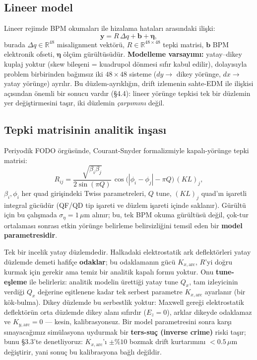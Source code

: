 \documentclass[twocolumn,a4paper,10pt]{article}
\begin{document}
\subsection{Lineer model}
Lineer rejimde BPM okumaları ile hizalama hataları arasındaki ilişki:
\begin{equation}
\mathbf{y} = R\,\Delta q + \mathbf{b} + \boldsymbol{\eta},
\label{eq:lin}
\end{equation}
burada $\Delta q\in\mathbb{R}^{48}$ misalignment vektörü,
$R\in\mathbb{R}^{48\times48}$ tepki matrisi, $\mathbf{b}$ BPM elektronik
ofseti, $\boldsymbol{\eta}$ ölçüm gürültüsüdür. \textbf{Modelleme varsayımı:}
yatay--dikey kuplaj yoktur (skew bileşeni = kuadrupol dönmesi sıfır kabul edilir),
dolayısıyla problem birbirinden bağımsız iki $48\times48$ sisteme ($dy\to$ dikey
yörünge, $dx\to$ yatay yörünge) ayrılır. Bu düzlem-ayrıklığın, drift izlemenin
sahte-EDM ile ilişkisi açısından önemli bir sonucu vardır (\S4.4): lineer yörünge
tepkisi tek bir düzlemin yer değiştirmesini taşır, iki düzlemin \emph{çarpımını}
değil.

\subsection{Tepki matrisinin analitik inşası}
Periyodik FODO örgüsünde, Courant-Snyder formalizmiyle \cite{lee2011}
kapalı-yörünge tepki matrisi:
\begin{equation}
R_{ij} = \frac{\sqrt{\beta_i\beta_j}}{2\sin(\pi Q)}\,
         \cos\!\bigl(|\phi_i-\phi_j|-\pi Q\bigr)\,(KL)_j,
\label{eq:R}
\end{equation}
$\beta_i,\phi_i$ her quad girişindeki Twiss parametreleri, $Q$ tune, $(KL)_j$
quad'ın işaretli integral gücüdür (QF/QD tip işareti ve düzlem işareti içinde
saklanır). Gürültü için bu çalışmada $\sigma_\eta = 1\,\mu$m alınır; bu, tek
BPM okuma gürültüsü değil, çok-tur ortalaması sonrası etkin yörünge belirleme
belirsizliğini temsil eden bir \textbf{model parametresidir}.

Tek bir incelik yatay düzlemdedir. Halkadaki elektrostatik ark deflektörleri
yatay düzlemde demeti hafifçe \textbf{odaklar}; bu odaklamanın gücü
$K_{x,\text{arc}}$, $R$'yi doğru kurmak için gerekir ama temiz bir analitik
kapalı formu yoktur. Onu \textbf{tune-eşleme} ile belirleriz: analitik modelin
ürettiği yatay tune $Q_x$, tam izleyicinin verdiği $Q_x$ değerine eşitlenene
kadar tek serbest parametre $K_{x,\text{arc}}$ ayarlanır (bir kök-bulma). Dikey
düzlemde bu serbestlik yoktur: Maxwell gereği elektrostatik deflektörün orta
düzlemde dikey alanı sıfırdır ($E_z=0$), arklar dikeyde odaklamaz ve
$K_{y,\text{arc}}=0$ --- kesin, kalibrasyonsuz. Bir model parametresini sonra
karşı sınayacağımız simülasyona uydurmak bir \textbf{ters-suç (inverse crime)}
riski taşır; bunu \S3.3'te denetliyoruz: $K_{x,\text{arc}}$'ı $\pm\%10$ bozmak
drift kurtarımını $<0.5\,\mu$m değiştirir, yani sonuç bu kalibrasyona bağlı
değildir.
\end{document}
